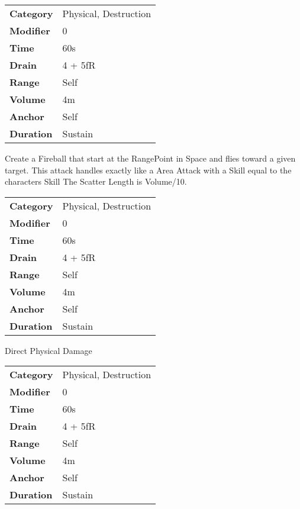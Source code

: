 
\begin{tabular}{ll}
    \textbf{Category} & Physical, Destruction \\
    \textbf{Modifier} & 0                     \\
    \textbf{Time}     & 60s                   \\
    \textbf{Drain}    & 4 + 5fR               \\
    \textbf{Range}    & Self                  \\
    \textbf{Volume}   & 4m                    \\
    \textbf{Anchor}   & Self                  \\
    \textbf{Duration} & Sustain               \\
\end{tabular}

\hfil

Create a Fireball that start at the RangePoint in Space and flies toward a given
target. This attack handles exactly like a Area
Attack with a Skill equal to the characters
Skill The Scatter
Length is Volume/10.


\begin{tabular}{ll}
    \textbf{Category} & Physical, Destruction \\
    \textbf{Modifier} & 0                     \\
    \textbf{Time}     & 60s                   \\
    \textbf{Drain}    & 4 + 5fR               \\
    \textbf{Range}    & Self                  \\
    \textbf{Volume}   & 4m                    \\
    \textbf{Anchor}   & Self                  \\
    \textbf{Duration} & Sustain               \\
\end{tabular}

\hfil

Direct Physical Damage



\begin{tabular}{ll}
    \textbf{Category} & Physical, Destruction \\
    \textbf{Modifier} & 0                     \\
    \textbf{Time}     & 60s                   \\
    \textbf{Drain}    & 4 + 5fR               \\
    \textbf{Range}    & Self                  \\
    \textbf{Volume}   & 4m                    \\
    \textbf{Anchor}   & Self                  \\
    \textbf{Duration} & Sustain               \\
\end{tabular}

